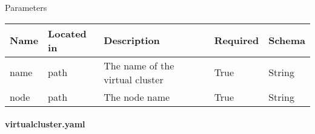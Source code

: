 Parameters

\begin{longtable}[]{@{}p{}p{}p{}p{}p{}@{}}
\toprule
Name & Located in & Description & Required & Schema\tabularnewline
\midrule
\endhead
name & path & The name of the virtual cluster & True &
String\tabularnewline
node & path & The node name & True & String\tabularnewline
\bottomrule
\end{longtable}

\hypertarget{virtualcluster.yaml}{%
\paragraph{virtualcluster.yaml}\label{virtualcluster.yaml}}

\begin{verbatim}
\end{verbatim}


